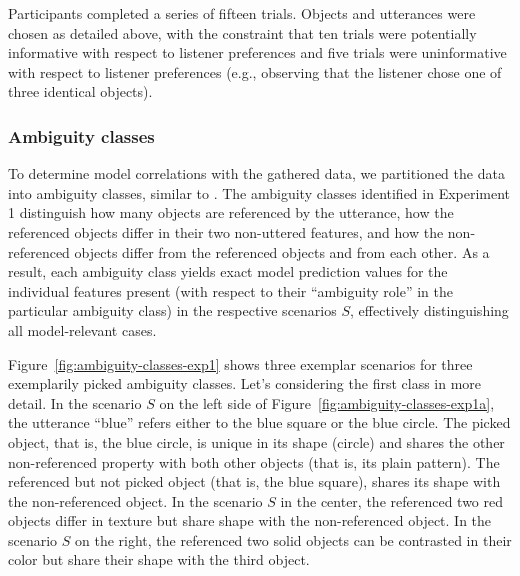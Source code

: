 \documentclass[10pt,a4paper]{article}
\begin{document}
Participants completed a series of fifteen trials. Objects and utterances were chosen as detailed above, with the constraint that ten trials were potentially informative with respect to listener preferences and five trials were uninformative with respect to listener preferences (e.g., observing that the listener chose one of three identical objects). 



\subsubsection*{Ambiguity classes}
To determine model correlations with the gathered data, we partitioned the data into ambiguity classes, similar to . 
The ambiguity classes identified in Experiment 1 distinguish how many objects are referenced by the utterance, how the referenced objects differ in their two non-uttered features, and how the non-referenced objects differ from the referenced objects and from each other.
As a result, each ambiguity class yields exact model prediction values for the individual features present (with respect to their ``ambiguity role'' in the particular ambiguity class) in the respective scenarios $S$, effectively distinguishing all model-relevant cases. 

Figure~\ref{fig:ambiguity-classes-exp1} shows three exemplar scenarios for three exemplarily picked ambiguity classes. 
Let's considering the first class in more detail.
In the scenario $S$ on the left side of Figure~\ref{fig:ambiguity-classes-exp1a}, 
the utterance ``blue'' refers either to the blue square or the blue circle.
The picked object, that is, the blue circle, is unique in its shape (circle) and shares the other non-referenced property with both other objects (that is, its plain pattern). 
The referenced but not picked object (that is, the blue square), shares its shape with the non-referenced object. 
In the scenario $S$ in the center, the referenced two red objects differ in texture but share shape with the non-referenced object.
In the scenario $S$ on the right, the referenced two solid objects can be contrasted in their color but share their shape with the third object.
\end{document}

